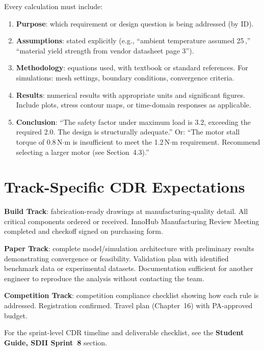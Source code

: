 Every calculation must include:
\begin{enumerate}[nosep,leftmargin=1.5em]
\item \textbf{Purpose}: which requirement or design question is being addressed (by ID).
\item \textbf{Assumptions}: stated explicitly (e.g., ``ambient temperature assumed 25\,\degC{},'' ``material yield strength from vendor datasheet page 3'').
\item \textbf{Methodology}: equations used, with textbook or standard references. For simulations: mesh settings, boundary conditions, convergence criteria.
\item \textbf{Results}: numerical results with appropriate units and significant figures. Include plots, stress contour maps, or time-domain responses as applicable.
\item \textbf{Conclusion}: ``The safety factor under maximum load is 3.2, exceeding the required 2.0. The design is structurally adequate.'' Or: ``The motor stall torque of 0.8\,N$\cdot$m is insufficient to meet the 1.2\,N$\cdot$m requirement. Recommend selecting a larger motor (see Section~4.3).''
\end{enumerate}

\section{Track-Specific CDR Expectations}
\textbf{Build Track}: fabrication-ready drawings at manufacturing-quality detail. All critical components ordered or received. InnoHub Manufacturing Review Meeting completed and checkoff signed on purchasing form.

\textbf{Paper Track}: complete model/simulation architecture with preliminary results demonstrating convergence or feasibility. Validation plan with identified benchmark data or experimental datasets. Documentation sufficient for another engineer to reproduce the analysis without contacting the team.

\textbf{Competition Track}: competition compliance checklist showing how each rule is addressed. Registration confirmed. Travel plan (Chapter~16) with PA-approved budget.

\begin{tipbox}
For the sprint-level CDR timeline and deliverable checklist, see the \textbf{Student Guide, SDII Sprint~8} section.
\end{tipbox}

